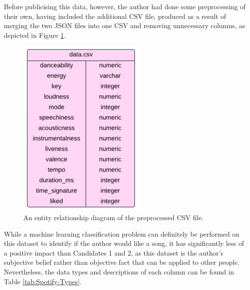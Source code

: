 \documentclass[12pt]{report}
\begin{document}
Before publicising this data, however, the author had done some preprocessing of their own, having included the additional CSV file,
produced as a result of merging the two JSON files into one CSV and removing unnecessary columns, as depicted in Figure \ref{fig:Spotify-ERD}.

\begin{figure}[H]
    \centering
    \includegraphics[width=.5\linewidth]{Spotify-ERD.png}
    \caption{An entity relationship diagram of the preprocessed CSV file.}
    \label{fig:Spotify-ERD}
\end{figure}

While a machine learning classification problem can definitely be performed on this dataset to identify if the author would like a song, 
it has significantly less of a positive impact than Candidates 1 and 2, as this dataset is the author's subjective belief rather than objective
fact that can be applied to other people. Nevertheless, the data types and descriptions of each column can be found in Table \ref{tab:Spotify-Types}.
\end{document}
